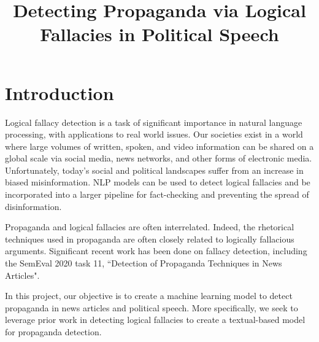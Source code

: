 \documentclass[conference]{IEEEtran}
\begin{document}
\title{Detecting Propaganda via Logical Fallacies in Political Speech}

\author{
\and
{}
\and
{}

}

\maketitle
\section{Introduction}
Logical fallacy detection is a task of significant importance in natural language processing, with applications to real world issues. Our societies exist in a world where large volumes of written, spoken, and video information can be shared on a global scale via social media, news networks, and other forms of electronic media. Unfortunately, today’s social and political landscapes suffer from an increase in biased misinformation. NLP models can be used to detect logical fallacies and be incorporated into a larger pipeline for fact-checking and preventing the spread of disinformation.

Propaganda and logical fallacies are often interrelated. Indeed, the rhetorical techniques used in propaganda are often closely related to logically fallacious arguments\cite{jin2022logical}. Significant recent work has been done on fallacy detection, including the SemEval 2020 task 11, ``Detection of Propaganda Techniques in News Articles"\cite{2020-semeval-task-11}. 

In this project, our objective is to create a machine learning model to detect propaganda in news articles and political speech. More specifically, we seek to leverage prior work in detecting logical fallacies to create a textual-based model for propaganda detection. 
\end{document}
